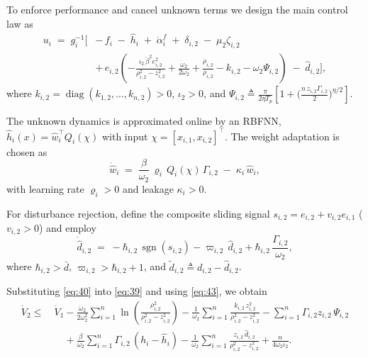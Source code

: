 \documentclass[pdflatex,sn-mathphys-num]{sn-jnl}%
\theoremstyle{thmstyleone}%
\theoremstyle{thmstyletwo}%
\theoremstyle{thmstylethree}%
\begin{document}
To enforce performance and cancel unknown terms we design the main control law as
\begin{equation}\label{eq:40}
\begin{aligned}
  u_i \;=\; g_i^{-1}\Big[
     &-\,f_i \;-\; \hat h_i \;+\; \dot\alpha^f_i \;+\; \delta_{i,2} \;-\; \mu_2\zeta_{i,2} \\
     &+\, e_{i,2}\!\left(
          -\frac{\iota_2\,\dot\beta^{2} e_{i,2}^{2}}{\rho_{i,2}^{2}-z_{i,2}^{2}}
          +\frac{\dot\omega_2}{2\omega_2}
          +\frac{\dot\rho_{i,2}}{\rho_{i,2}}
          - k_{i,2} - \omega_2\Psi_{i,2}
        \right)
     \;-\; \hat d_{i,2}
  \Big],
\end{aligned}
\end{equation}
where $k_{i,2}=\operatorname{diag}(k_{1,2},\ldots,k_{n,2})>0$, $\iota_2>0$,
and
$\displaystyle \Psi_{i,2}\triangleq \frac{\pi}{2\eta T_p}\!\left[1+\Big(\tfrac{n\,z_{i,2}\Gamma_{i,2}}{2}\Big)^{\eta/2}\right]$.

The unknown dynamics is approximated online by an RBFNN,
$\hat h_i(x)=\hat w_i^{\top}Q_i(\chi)$ with input $\chi=[x_{i,1},x_{i,2}]^\top$.
The weight adaptation is chosen as
\begin{equation}\label{eq:42}
  \dot{\hat w}_i
  \;=\; \frac{\beta}{\omega_2}\,\varrho_i\,Q_i(\chi)\,\Gamma_{i,2} \;-\; \kappa_i\,\hat w_i,
\end{equation}
with learning rate $\varrho_i>0$ and leakage $\kappa_i>0$.

For disturbance rejection, define the composite sliding signal
$s_{i,2}=e_{i,2}+v_{i,2}e_{i,1}$ ($v_{i,2}>0$) and employ
\begin{equation}\label{eq:41}
  \dot{\hat d}_{i,2}
  \;=\; -\hbar_{i,2}\,\operatorname{sgn}(s_{i,2})
        -\varpi_{i,2}\,\hat d_{i,2}
        +\hbar_{i,2}\,\frac{\Gamma_{i,2}}{\omega_{2}},
\end{equation}
where $\hbar_{i,2}>\bar d$, $\varpi_{i,2}>\hbar_{i,2}+1$, and
$\tilde d_{i,2}\triangleq d_{i,2}-\hat d_{i,2}$.

Substituting \eqref{eq:40} into \eqref{eq:39} and using \eqref{eq:43}, we obtain
\begin{equation}\label{eq:44}
\begin{aligned}
  \dot V_2
  \le\ &
  \dot V_1
  -\frac{\dot\omega_2}{2\omega_2^2}\sum_{i=1}^{n}\ln\!\left(\frac{\rho_{i,2}^2}{\rho_{i,2}^2 - z_{i,2}^2}\right)
  - \frac{1}{\omega_{2}}\sum_{i=1}^{n}\frac{k_{i,2}\,z_{i,2}^{2}}{\rho_{i,2}^{2}-z_{i,2}^{2}}
  - \sum_{i=1}^{n}\Gamma_{i,2}z_{i,2}\,\Psi_{i,2} \\
  &\quad + \frac{\beta}{\omega_{2}}\sum_{i=1}^{n}\Gamma_{i,2}\,(h_i-\hat h_i)
          - \frac{1}{\omega_{2}}\sum_{i=1}^{n}\frac{z_{i,2}\,\hat d_{i,2}}{\rho_{i,2}^{2}-z_{i,2}^{2}}
          + \frac{n}{4\omega_2\iota_2}.
\end{aligned}
\end{equation}
\end{document}
